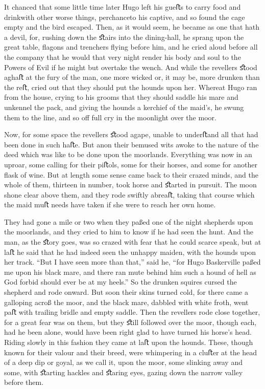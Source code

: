 \documentclass[paper=a5,BCOR=7mm,twoside,DIV=calc,12pt,usegeometry,openany,chapterprefix,endperiod,headings=big]{scrbook} %
\begin{document}
It chanced that some little time later Hugo left his gueﬅs to carry food and drink\textemdash with other worse things, perchance\textemdash to his captive, and so found the cage empty and the bird escaped. Then, as it would seem, he became as one that hath a devil, for, rushing down the ﬆairs into the dining-hall, he sprang upon the great table, ﬂagons and trenchers ﬂying before him, and he cried aloud before all the company that he would that very night render his body and soul to the Powers of Evil if he might but overtake the wench. And while the revellers ﬆood aghaﬅ at the fury of the man, one more wicked or, it may be, more drunken than the reﬅ, cried out that they should put the hounds upon her. Whereat Hugo ran from the house, crying to his grooms that they should saddle his mare and unkennel the pack, and giving the hounds a kerchief of the maid's, he swung them to the line, and so oﬀ full cry in the moonlight over the moor.

Now, for some space the revellers ﬆood agape, unable to underﬅand all that had been done in such haﬅe. But anon their bemused wits awoke to the nature of the deed which was like to be done upon the moorlands. Everything was now in an uproar, some calling for their piﬅols, some for their horses, and some for another ﬂask of wine. But at length some sense came back to their crazed minds, and the whole of them, thirteen in number, took horse and ﬆarted in pursuit. The moon shone clear above them, and they rode swiftly abreaﬅ, taking that course which the maid muﬅ needs have taken if she were to reach her own home.

They had gone a mile or two when they paßed one of the night shepherds upon the moorlands, and they cried to him to know if he had seen the hunt. And the man, as the ﬆory goes, was so crazed with fear that he could scarce speak, but at laﬅ he said that he had indeed seen the unhappy maiden, with the hounds upon her track. \enquote{But I have seen more than that,} said he, \enquote{for Hugo Baskerville paßed me upon his black mare, and there ran mute behind him such a hound of hell as God forbid should ever be at my heels.} So the drunken squires cursed the shepherd and rode onward. But soon their skins turned cold, for there came a galloping acroß the moor, and the black mare, dabbled with white froth, went paﬅ with trailing bridle and empty saddle. Then the revellers rode close together, for a great fear was on them, but they ﬆill followed over the moor, though each, had he been alone, would have been right glad to have turned his horse's head. Riding slowly in this fashion they came at laﬅ upon the hounds. These, though known for their valour and their breed, were whimpering in a cluﬅer at the head of a deep dip or goyal, as we call it, upon the moor, some slinking away and some, with ﬆarting hackles and ﬆaring eyes, gazing down the narrow valley before them.
\end{document}
